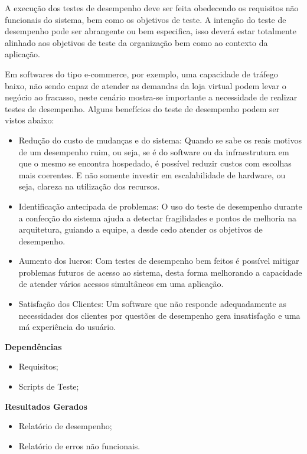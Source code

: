 A execução dos testes de desempenho deve ser feita obedecendo os requisitos não funcionais do sistema, bem como os objetivos de teste. A intenção do teste de desempenho pode ser abrangente ou bem especifica, isso deverá estar totalmente alinhado aos objetivos de teste da organização bem como ao contexto da aplicação.

Em softwares do tipo e-commerce, por exemplo, uma capacidade de tráfego baixo, não sendo capaz de atender as demandas da loja virtual podem levar o negócio ao fracasso, neste cenário mostra-se importante a necessidade de realizar testes de desempenho. Alguns benefícios do teste de desempenho podem ser vistos abaixo:

\begin{itemize}
	\item Redução do custo de mudanças e do sistema: Quando se sabe os reais motivos de um desempenho ruim, ou seja, se é do software ou da infraestrutura em que o mesmo se encontra hospedado, é possível reduzir custos com escolhas mais coerentes. E não somente investir em escalabilidade de hardware, ou seja, clareza na utilização dos recursos.
	\item Identificação antecipada de problemas: O uso do teste de desempenho durante a confecção do sistema ajuda a detectar fragilidades e pontos de melhoria na arquitetura, guiando a equipe, a desde cedo atender os objetivos de desempenho.
	\item Aumento dos lucros: Com testes de desempenho bem feitos é possível mitigar problemas futuros de acesso ao sistema, desta forma melhorando a capacidade de atender vários acessos simultâneos em uma aplicação.
	\item Satisfação dos Clientes: Um software que não responde adequadamente as necessidades dos clientes por questões de desempenho gera insatisfação e uma má experiência do usuário.
\end{itemize}

\textbf{Dependências}
\begin{itemize}
    \item Requisitos;
    \item Scripts de Teste;
\end{itemize}

\textbf{Resultados Gerados}
\begin{itemize}
    \item Relatório de desempenho;
    \item Relatório de erros não funcionais.
\end{itemize}

